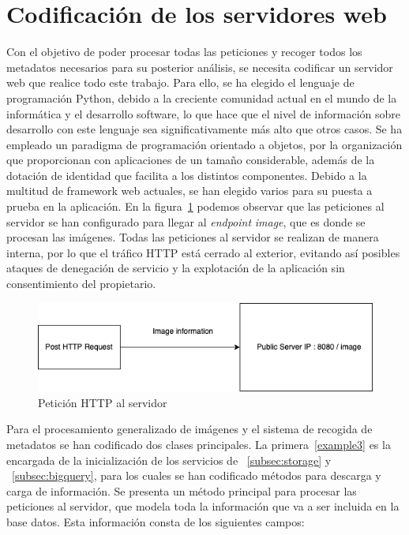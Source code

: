\section{Codificación de los servidores web}\label{sec:codificación-de-los-servidores-web}
Con el objetivo de poder procesar todas las peticiones y recoger todos los metadatos necesarios para su posterior análisis, se necesita codificar un servidor web que realice todo este trabajo.
Para ello, se ha elegido el lenguaje de programación Python, debido a la creciente comunidad actual en el mundo de la informática y el desarrollo software, lo que hace que el nivel de información sobre desarrollo con este lenguaje sea significativamente más alto que otros casos.
Se ha empleado un paradigma de programación orientado a objetos, por la organización que proporcionan con aplicaciones de un tamaño considerable, además de la dotación de identidad que facilita a los distintos componentes. Debido a la multitud de framework web actuales, se han elegido varios para su puesta a prueba en la aplicación.
En la figura~\ref{fig:Petición HTTP al servidor} podemos observar que las peticiones al servidor se han configurado para llegar al \textit{endpoint} \textit{image}, que es donde se procesan las imágenes.
Todas las peticiones al servidor se realizan de manera interna, por lo que el tráfico HTTP está cerrado al exterior, evitando así posibles ataques de denegación de servicio y la explotación de la aplicación sin consentimiento del propietario.

\begin{figure}
    \centering
    \includegraphics[width=1.0\textwidth]{images/chapter4/http_request.png}
    \caption{Petición HTTP al servidor}
    \label{fig:Petición HTTP al servidor}
\end{figure}

Para el procesamiento generalizado de imágenes y el sistema de recogida de metadatos se han codificado dos clases principales.
La primera~\ref{example3} es la encargada de la inicialización de los servicios de ~\ref{subsec:storage} y ~\ref{subsec:bigquery}, para los cuales se han codificado métodos para descarga y carga de información.
Se presenta un método principal para procesar las peticiones al servidor, que modela toda la información que va a ser incluida en la base datos.
Esta información consta de los siguientes campos:

